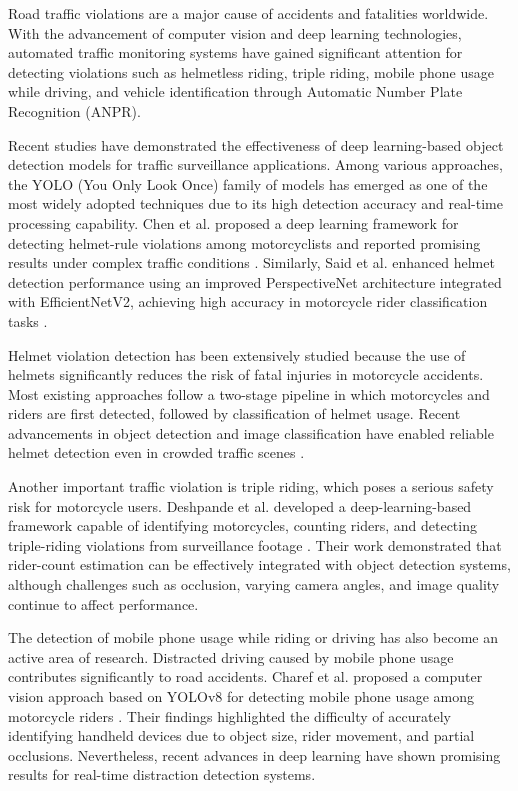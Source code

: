 Road traffic violations are a major cause of accidents and fatalities worldwide. With the advancement of computer vision and deep learning technologies, automated traffic monitoring systems have gained significant attention for detecting violations such as helmetless riding, triple riding, mobile phone usage while driving, and vehicle identification through Automatic Number Plate Recognition (ANPR).

Recent studies have demonstrated the effectiveness of deep learning-based object detection models for traffic surveillance applications. Among various approaches, the YOLO (You Only Look Once) family of models has emerged as one of the most widely adopted techniques due to its high detection accuracy and real-time processing capability. Chen et al. proposed a deep learning framework for detecting helmet-rule violations among motorcyclists and reported promising results under complex traffic conditions \cite{Chen2024}. Similarly, Said et al. enhanced helmet detection performance using an improved PerspectiveNet architecture integrated with EfficientNetV2, achieving high accuracy in motorcycle rider classification tasks \cite{Said2024}.

Helmet violation detection has been extensively studied because the use of helmets significantly reduces the risk of fatal injuries in motorcycle accidents. Most existing approaches follow a two-stage pipeline in which motorcycles and riders are first detected, followed by classification of helmet usage. Recent advancements in object detection and image classification have enabled reliable helmet detection even in crowded traffic scenes \cite{Chen2024, Said2024}.

Another important traffic violation is triple riding, which poses a serious safety risk for motorcycle users. Deshpande et al. developed a deep-learning-based framework capable of identifying motorcycles, counting riders, and detecting triple-riding violations from surveillance footage \cite{Deshpande2025}. Their work demonstrated that rider-count estimation can be effectively integrated with object detection systems, although challenges such as occlusion, varying camera angles, and image quality continue to affect performance.

The detection of mobile phone usage while riding or driving has also become an active area of research. Distracted driving caused by mobile phone usage contributes significantly to road accidents. Charef et al. proposed a computer vision approach based on YOLOv8 for detecting mobile phone usage among motorcycle riders \cite{Charef2025}. Their findings highlighted the difficulty of accurately identifying handheld devices due to object size, rider movement, and partial occlusions. Nevertheless, recent advances in deep learning have shown promising results for real-time distraction detection systems.

